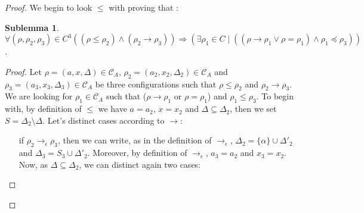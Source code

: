 \documentclass[a4paper,10pt]{report}
\newtheorem{slm}{Sublemma}[lm]
\newcommand{\C}{\mathcal{C}_{A}}
\begin{document}
\begin{proof}
  We begin to look $\leq$ with proving that :
  \begin{slm}
  $\forall (\rho,\rho_2,\rho_3) \in C^3  ((\rho \leq \rho_2) \wedge (\rho_2 \rightarrow \rho_3)) \Rightarrow (\exists \rho_1 \in C \mid ((\rho \rightarrow \rho_1 \vee \rho = \rho_1) \wedge \rho_1 \preceq \rho_3))$.
 
  \end{slm}
   \begin{proof}
   Let $\rho = (a,x,\Delta) \in \C$, $\rho_2 = (a_2,x_2,\Delta_2) \in \C$ and $\rho_3 = (a_3,x_3,\Delta_3) \in \C$ be three configurations 
   such that $\rho \leq \rho_2$ and $\rho_2 \rightarrow \rho_3$. We are looking for $\rho_1 \in \C$ such that ($\rho \rightarrow \rho_1$ or $\rho = \rho_1$) and $\rho_1 \leq \rho_3$.
   To begin with, by definition of $\leq$ we have $a = a_2$, $x= x_2$ and $\Delta \subseteq \Delta_2$, then we set $S = \Delta_2 \setminus \Delta$. Let's distinct cases according to $\rightarrow$: 
   \begin{itemize}
    \item [if $\rho_2 \rightarrow_{\epsilon} \rho_3$,] 
    then we can write, as in the definition of $\rightarrow_{\epsilon}$,  $\Delta_2 = \{\alpha \} \cup \Delta'_2$ and $\Delta_3 = S_3 \cup \Delta'_2 $.
    Moreover, by definition of $\rightarrow_{\epsilon}$, $a_3 = a_2$ and $x_3 = x_2$.
    Now, as $\Delta \subseteq \Delta_2$, we can distinct again two cases:


\end{itemize}
\end{proof}
\end{proof}
\end{document}
